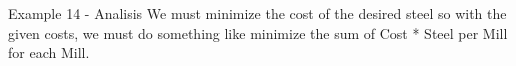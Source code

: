 \begin{frame}{Example 14 - Analisis}
We must minimize the cost of the desired steel so with the given costs,
we must do something like minimize the sum of Cost * Steel per Mill
for each Mill.
\end{frame}

